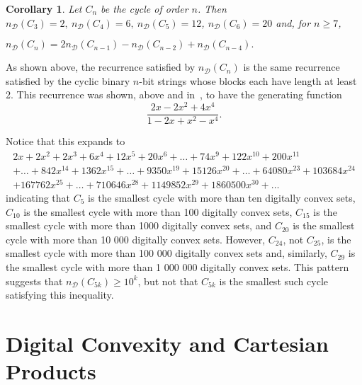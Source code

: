 \documentclass[12pt]{article}
\newtheorem{cor}[thm]{Corollary}
\begin{document}
\begin{cor}
Let $C_n$ be the cycle of order $n$. Then $n_\mathscr{D}(C_3)=2,~n_\mathscr{D}(C_4)=6,~n_\mathscr{D}(C_5)=12$, $ n_\mathscr{D}(C_6)=20$ and, for $n\geq 7$, \begin{center}$n_\mathscr{D}(C_n)=2n_\mathscr{D}(C_{n-1})-n_\mathscr{D}(C_{n-2})+n_\mathscr{D}(C_{n-4}).$\end{center}
\end{cor}

As shown above, the recurrence satisfied by $n_\mathscr{D}(C_n)$ is the same recurrence satisfied by the cyclic binary $n$-bit strings whose blocks each have length at least 2. This recurrence was shown, above and in~\cite{zigzag}, to have the generating function $$\frac{2x-2x^2+4x^4}{1-2x+x^2-x^4}.$$

Notice that this expands to 
\begin{equation*}\begin{gathered}2x + 2 x^2 + 2 x^3 + 6 x^4 + 12 x^5 + 20 x^6 + \dots + 74 x^9 +  122 x^{10} + 200 x^{11} \\ + \dots + 842 x^{14} + 1362 x^{15} + \dots + 9350 x^{19} + 15 126 x^{20} + \dots + 64080 x^{23} + 103 684 x^{24} \\+ 167 762 x^{25} + \dots + 710646 x^{28} + 1 149 852 x^{29} + 1 860 500 x^{30} + \dots\end{gathered}\end{equation*}
indicating that $C_5$ is the smallest cycle with more than ten digitally convex sets, $C_{10}$ is the smallest cycle with more than 100 digitally convex sets, $C_{15}$ is the smallest cycle with more than 1000 digitally convex sets, and $C_{20}$ is the smallest cycle with more than 10 000 digitally convex sets. However, $C_{24}$, not $C_{25}$, is the smallest cycle with more than 100 000 digitally convex sets and, similarly, $C_{29}$ is the smallest cycle with more than 1 000 000 digitally convex sets. This pattern suggests that $n_\mathscr{D}(C_{5k}) \geq 10^k$, but not that $C_{5k}$ is the smallest such cycle satisfying this inequality.

\section{Digital Convexity and Cartesian Products}
\end{document}
